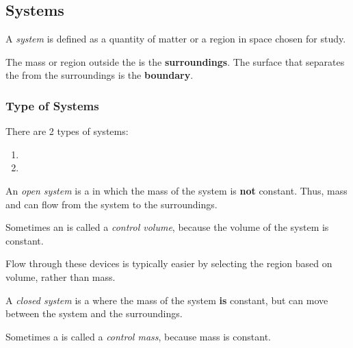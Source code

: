 \subsection{Systems}\label{subsec:Systems}
\begin{definition}[System]\label{def:System}
  A \emph{system} is defined as a quantity of matter or a region in space chosen for study.
\end{definition}

The mass or region outside the  is the \textbf{surroundings}.
The surface that separates the  from the surroundings is the \textbf{boundary}.

\subsubsection{Type of Systems}\label{subsubsec:Types_Systems}
There are 2 types of systems:
\begin{enumerate}[noitemsep]
\item {}
\item {}
\end{enumerate}

\begin{definition}\label{def:Open_System}
  An \emph{open system} is a  in which the mass of the system is \textbf{not} constant.
  Thus, mass and  can flow from the system to the surroundings.

  \begin{remark}\label{rmk:Control_Volume}
    Sometimes an  is called a \emph{control volume}, because the volume of the system is constant.
  \end{remark}

  \begin{remark}
    Flow through these devices is typically easier by selecting the region based on volume, rather than mass.
  \end{remark}
\end{definition}

\begin{definition}\label{def:Closed_System}
  A \emph{closed system} is a  where the mass of the system \textbf{is} constant, but  can move between the system and the surroundings.

  \begin{remark}\label{rmk:Control_Mass}
    Sometimes a  is called a \emph{control mass}, because mass is constant.
  \end{remark}
\end{definition}


